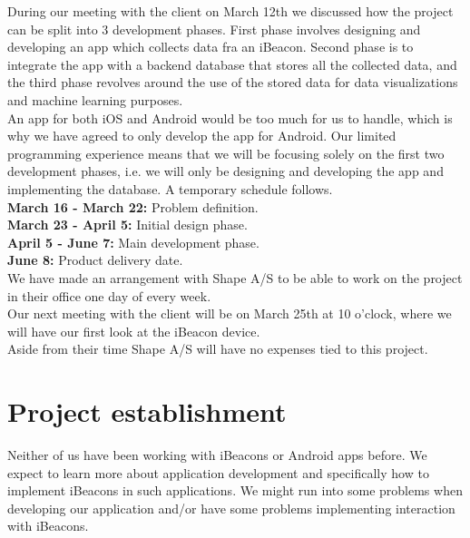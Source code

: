 \documentclass[12pt]{article}
\begin{document}
During our meeting with the client on March 12th we discussed how the project can be split into 3 development phases. First phase involves designing and developing an app which collects data fra an iBeacon. Second phase is to integrate the app with a backend database that stores all the collected data, and the third phase revolves around the use of the stored data for data visualizations and machine learning purposes.\\

An app for both iOS and Android would be too much for us to handle, which is why we have agreed to only develop the app for Android. Our limited programming experience means that we will be focusing solely on the first two development phases, i.e. we will only be designing and developing the app and implementing the database. A temporary schedule follows.\\

\textbf{March 16 - March 22:} Problem definition.\\
\textbf{March 23 - April 5:} Initial design phase.\\
\textbf{April 5 - June 7:} Main development phase.\\
\textbf{June 8:} Product delivery date.\\

We have made an arrangement with Shape A/S to be able to work on the project in their office one day of every week.\\

Our next meeting with the client will be on March 25th at 10 o'clock, where we will have our first look at the iBeacon device.\\

Aside from their time Shape A/S will have no expenses tied to this project.










\section{Project establishment}

Neither of us have been working with iBeacons or Android apps before. We expect to learn more about application development and specifically how to implement iBeacons in such applications. We might run into some problems when developing our application and/or have some problems implementing interaction with iBeacons.\\
\end{document}
